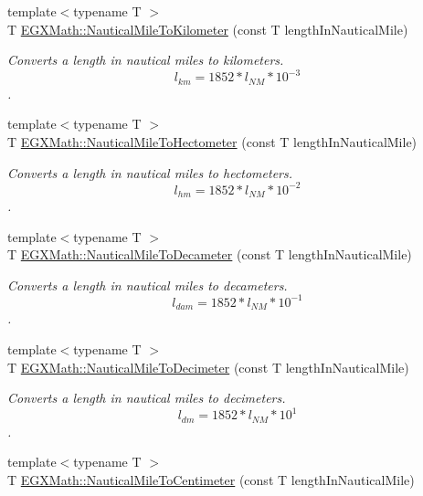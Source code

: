 \begin{DoxyCompactItemize}
{\footnotesize template$<$typename T $>$ }\\T \mbox{\hyperlink{group___e_g_x_math-_conversions-_length_conversions-_non-_s_i-_nautical_mile-_s_i_ga3bdd35fac83cfac8d0f6cfc789d1c8f4}{E\+G\+X\+Math\+::\+Nautical\+Mile\+To\+Kilometer}} (const T length\+In\+Nautical\+Mile)
\begin{DoxyCompactList}\small\item\em Converts a length in nautical miles to kilometers. \[ l_{km}=1852 * l_{NM} * 10^{-3} \]. \end{DoxyCompactList}\item 
{\footnotesize template$<$typename T $>$ }\\T \mbox{\hyperlink{group___e_g_x_math-_conversions-_length_conversions-_non-_s_i-_nautical_mile-_s_i_gab23b612d39bfe199f77deb6d8d3d044d}{E\+G\+X\+Math\+::\+Nautical\+Mile\+To\+Hectometer}} (const T length\+In\+Nautical\+Mile)
\begin{DoxyCompactList}\small\item\em Converts a length in nautical miles to hectometers. \[ l_{hm}=1852 * l_{NM} * 10^{-2} \]. \end{DoxyCompactList}\item 
{\footnotesize template$<$typename T $>$ }\\T \mbox{\hyperlink{group___e_g_x_math-_conversions-_length_conversions-_non-_s_i-_nautical_mile-_s_i_gaec7c0bd4b19a2301d5033e19bac6e6eb}{E\+G\+X\+Math\+::\+Nautical\+Mile\+To\+Decameter}} (const T length\+In\+Nautical\+Mile)
\begin{DoxyCompactList}\small\item\em Converts a length in nautical miles to decameters. \[ l_{dam}=1852 * l_{NM} * 10^{-1} \]. \end{DoxyCompactList}\item 
{\footnotesize template$<$typename T $>$ }\\T \mbox{\hyperlink{group___e_g_x_math-_conversions-_length_conversions-_non-_s_i-_nautical_mile-_s_i_gabd0d42a12028a741852737b122d60f28}{E\+G\+X\+Math\+::\+Nautical\+Mile\+To\+Decimeter}} (const T length\+In\+Nautical\+Mile)
\begin{DoxyCompactList}\small\item\em Converts a length in nautical miles to decimeters. \[ l_{dm}=1852 * l_{NM} * 10^{1} \]. \end{DoxyCompactList}\item 
{\footnotesize template$<$typename T $>$ }\\T \mbox{\hyperlink{group___e_g_x_math-_conversions-_length_conversions-_non-_s_i-_nautical_mile-_s_i_gae387f69d6b598c6f2381c33684fd9afe}{E\+G\+X\+Math\+::\+Nautical\+Mile\+To\+Centimeter}} (const T length\+In\+Nautical\+Mile)

\end{DoxyCompactItemize}
